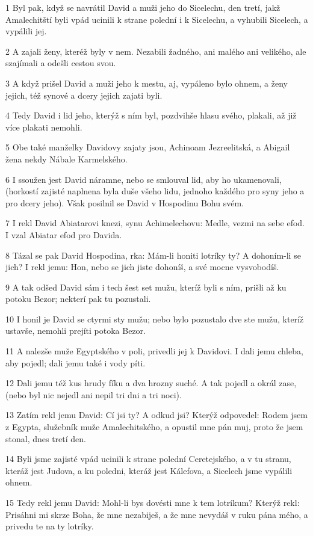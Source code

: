 \par 1 Byl pak, když se navrátil David a muži jeho do Sicelechu, den tretí, jakž Amalechitští byli vpád ucinili k strane polední i k Sicelechu, a vyhubili Sicelech, a vypálili jej.
\par 2 A zajali ženy, kteréž byly v nem. Nezabili žadného, ani malého ani velikého, ale szajímali a odešli cestou svou.
\par 3 A když prišel David a muži jeho k mestu, aj, vypáleno bylo ohnem, a ženy jejich, též synové a dcery jejich zajati byli.
\par 4 Tedy David i lid jeho, kterýž s ním byl, pozdvihše hlasu svého, plakali, až již více plakati nemohli.
\par 5 Obe také manželky Davidovy zajaty jsou, Achinoam Jezreelitská, a Abigail žena nekdy Nábale Karmelského.
\par 6 I ssoužen jest David náramne, nebo se smlouval lid, aby ho ukamenovali, (horkostí zajisté naplnena byla duše všeho lidu, jednoho každého pro syny jeho a pro dcery jeho). Však posilnil se David v Hospodinu Bohu svém.
\par 7 I rekl David Abiatarovi knezi, synu Achimelechovu: Medle, vezmi na sebe efod. I vzal Abiatar efod pro Davida.
\par 8 Tázal se pak David Hospodina, rka: Mám-li honiti lotríky ty? A dohoním-li se jich? I rekl jemu: Hon, nebo se jich jiste dohoníš, a své mocne vysvobodíš.
\par 9 A tak odšed David sám i tech šest set mužu, kteríž byli s ním, prišli až ku potoku Bezor; nekterí pak tu pozustali.
\par 10 I honil je David se ctyrmi sty mužu; nebo bylo pozustalo dve ste mužu, kteríž ustavše, nemohli prejíti potoka Bezor.
\par 11 A nalezše muže Egyptského v poli, privedli jej k Davidovi. I dali jemu chleba, aby pojedl; dali jemu také i vody píti.
\par 12 Dali jemu též kus hrudy fíku a dva hrozny suché. A tak pojedl a okrál zase, (nebo byl nic nejedl ani nepil tri dni a tri noci).
\par 13 Zatím rekl jemu David: Cí jsi ty? A odkud jsi? Kterýž odpovedel: Rodem jsem z Egypta, služebník muže Amalechitského, a opustil mne pán muj, proto že jsem stonal, dnes tretí den.
\par 14 Byli jsme zajisté vpád ucinili k strane polední Ceretejského, a v tu stranu, kteráž jest Judova, a ku poledni, kteráž jest Kálefova, a Sicelech jsme vypálili ohnem.
\par 15 Tedy rekl jemu David: Mohl-li bys dovésti mne k tem lotríkum? Kterýž rekl: Prisáhni mi skrze Boha, že mne nezabiješ, a že mne nevydáš v ruku pána mého, a privedu te na ty lotríky.
